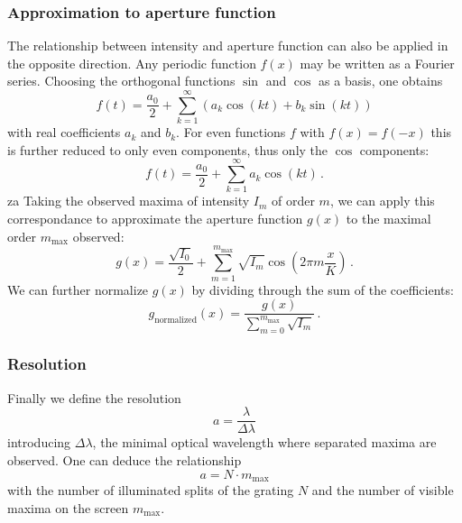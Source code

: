 \subsubsection{Approximation to aperture function}
The relationship between intensity and aperture function can also be applied in the 
opposite direction. Any periodic function $f(x)$ may be written as a Fourier series. 
Choosing the orthogonal functions $\sin$ and $\cos$ as a basis, one obtains 
\begin{equation}
    f(t)=\frac{a_{0}}{2}+\sum_{k=1}^{\infty}\left(a_{k}\cos\left(kt\right)+b_{k}\sin\left(kt\right)\right)
    \label{eq:fourier_series}
\end{equation}
with real coefficients $a_k$ and $b_k$. For even functions $f$ with $f(x) = f(-x)$ 
this is further reduced to only even components, thus only the $\cos$ components:
\begin{equation}
    f(t)=\frac{a_{0}}{2}+\sum_{k=1}^{\infty} a_{k}\cos\left(kt\right)\, .
    \label{eq:fourier_series_even}
\end{equation}za
Taking the observed maxima of intensity $I_m$ of order $m$, we can 
apply this correspondance to approximate the aperture function $g(x)$ 
to the maximal order $m_\mathrm{max}$ observed:
\begin{equation}
    g(x)=\frac{\sqrt{I_{0}}}{2}+\sum_{m=1}^{m_\mathrm{max}} \sqrt{I_m}\cos\left(2 \pi m \frac{x}{K}\right)\, .
    \label{eq:g_approx}
\end{equation}
We can further normalize $g(x)$ by dividing through the sum of the coefficients:
\begin{equation}
    g_\mathrm{normalized}(x)=\frac{g(x)}{\sum_{m=0}^{m_\mathrm{max}} \sqrt{I_m}}\, .
    \label{eq:g_approx}
\end{equation}

\subsubsection{Resolution}
\label{sec:resolution}
Finally we define the resolution
\begin{equation}
    a = \frac{\lambda}{\Delta \lambda}
\end{equation}
introducing $\Delta \lambda$, the minimal optical wavelength where separated maxima 
are observed. One can deduce the relationship
\begin{equation}
    a = N \cdot m_\mathrm{max}
    \label{eq:resolution}
\end{equation}
with the number of illuminated splits of the grating $N$ and the number of 
visible maxima on the screen $m_\mathrm{max}$.\cite{ver}
\clearpage

